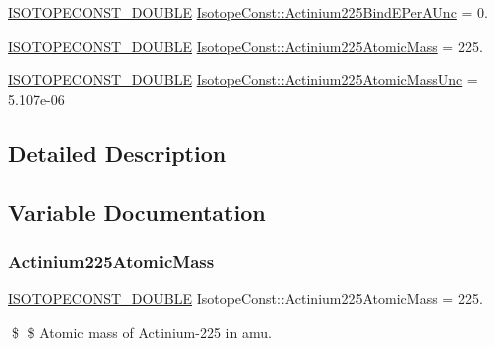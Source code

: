 \begin{DoxyCompactItemize}
\mbox{\hyperlink{group___isotope_const-_macros_ga8f45a7272ce02c0b4c65c44636ed719a}{I\+S\+O\+T\+O\+P\+E\+C\+O\+N\+S\+T\+\_\+\+D\+O\+U\+B\+LE}} \mbox{\hyperlink{group___isotope_const-_actinium-_ac225_ga668e7948a1537a7da021a45b3b2a7285}{Isotope\+Const\+::\+Actinium225\+Bind\+E\+Per\+A\+Unc}} = 0.
\item 
\mbox{\hyperlink{group___isotope_const-_macros_ga8f45a7272ce02c0b4c65c44636ed719a}{I\+S\+O\+T\+O\+P\+E\+C\+O\+N\+S\+T\+\_\+\+D\+O\+U\+B\+LE}} \mbox{\hyperlink{group___isotope_const-_actinium-_ac225_gad44eb0da002c7e88de122ba06f66cbb6}{Isotope\+Const\+::\+Actinium225\+Atomic\+Mass}} = 225.
\item 
\mbox{\hyperlink{group___isotope_const-_macros_ga8f45a7272ce02c0b4c65c44636ed719a}{I\+S\+O\+T\+O\+P\+E\+C\+O\+N\+S\+T\+\_\+\+D\+O\+U\+B\+LE}} \mbox{\hyperlink{group___isotope_const-_actinium-_ac225_ga7bae31d5cf9eb33526311d270a831b42}{Isotope\+Const\+::\+Actinium225\+Atomic\+Mass\+Unc}} = 5.\+107e-\/06
\end{DoxyCompactItemize}


\subsection{Detailed Description}


\subsection{Variable Documentation}
\mbox{\label{group___isotope_const-_actinium-_ac225_gad44eb0da002c7e88de122ba06f66cbb6}} 
\subsubsection{\texorpdfstring{Actinium225\+Atomic\+Mass}{Actinium225AtomicMass}}
{\footnotesize\ttfamily \mbox{\hyperlink{group___isotope_const-_macros_ga8f45a7272ce02c0b4c65c44636ed719a}{I\+S\+O\+T\+O\+P\+E\+C\+O\+N\+S\+T\+\_\+\+D\+O\+U\+B\+LE}} Isotope\+Const\+::\+Actinium225\+Atomic\+Mass = 225.}

\$ \$ Atomic mass of Actinium-\/225 in amu. \mbox{\label{group___isotope_const-_actinium-_ac225_ga7bae31d5cf9eb33526311d270a831b42}} 
